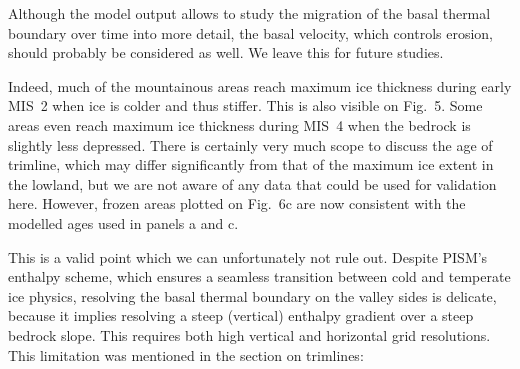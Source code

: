     Although the model output allows to study the migration of the basal
    thermal boundary over time into more detail, the basal velocity, which
    controls erosion, should probably be considered as well. We leave this for
    future studies.


    Indeed, much of the mountainous areas reach maximum ice thickness during
    early MIS~2 when ice is colder and thus stiffer. This is also visible on
    Fig.~5. Some areas even reach maximum ice thickness during MIS~4 when the
    bedrock is slightly less depressed. There is certainly very much scope to
    discuss the age of trimline, which may differ significantly from that of
    the maximum ice extent in the lowland, but we are not aware of any data
    that could be used for validation here. However, frozen areas plotted on
    Fig.~6c are now consistent with the modelled ages used in panels a and c.


    This is a valid point which we can unfortunately not rule out. Despite
    PISM's enthalpy scheme, which ensures a seamless transition between cold
    and temperate ice physics, resolving the basal thermal boundary on the
    valley sides is delicate, because it implies resolving a steep (vertical)
    enthalpy gradient over a steep bedrock slope. This requires both high
    vertical and horizontal grid resolutions. This limitation was mentioned
    in the section on trimlines:




